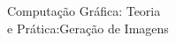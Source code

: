 \documentclass[preview]{standalone}
\begin{document}
Computação Gráfica: Teoria\\e Prática:Geração de Imagens\\
\end{document}
